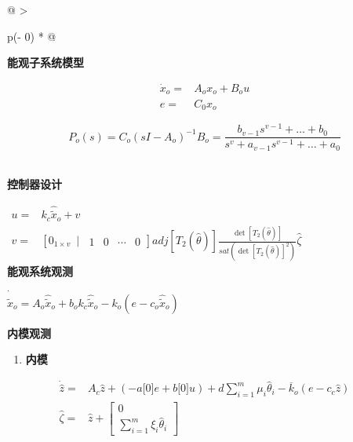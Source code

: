 \documentclass[
  12pt,
  a4paper
]{article}
\begin{document}
\begin{longtable}[]{@{}
  >{\raggedright\arraybackslash}p{}@{}}
\toprule\noalign{}
\begin{minipage}[b]{\linewidth}\raggedright
\textbf{能观子系统模型}

\[\begin{aligned}
{\dot{x}}_{o} = & A_{o}x_{o} + B_{o}u \\
e = & C_{0}x_{o}
\end{aligned}\]

\[P_{o}(s) = C_{o}\left( sI - A_{o} \right)^{- 1}B_{o} = \frac{b_{v - 1}s^{v - 1} + \ldots + b_{0}}{s^{v} + a_{v - 1}s^{v - 1} + \ldots + a_{0}}\]
\end{minipage} \\
\midrule\noalign{}
\endhead
\bottomrule\noalign{}
\endlastfoot
\textbf{控制器设计}

\(\begin{aligned}
u = & k_{c}{\widehat{\widetilde{x}}}_{o} + v \\
v = & \left\lbrack 0_{1 \times v}\ \mid\ \begin{matrix}
1 & 0 & \cdots & 0
\end{matrix} \right\rbrack adj\left\lbrack T_{2}\left( \widehat{\theta} \right) \right\rbrack\frac{\det\left\lbrack T_{2}\left( \widehat{\theta} \right) \right\rbrack}{sat\left( {\det\left\lbrack T_{2}\left( \widehat{\theta} \right) \right\rbrack}^{2} \right)}\widehat{\zeta}
\end{aligned}\) \\
\textbf{能观系统观测}

\({\dot{\widehat{\widetilde{x}}}}_{o} = A_{o}{\widehat{\widetilde{x}}}_{o} + b_{o}k_{c}{\widehat{\widetilde{x}}}_{o} - k_{o}(e - c_{o}{\widehat{\widetilde{x}}}_{o})\) \\
\begin{minipage}[t]{\linewidth}\raggedright
\textbf{内模观测}

\begin{enumerate}
\def\labelenumi{\arabic{enumi}.}
\item
  \textbf{内模}
\end{enumerate}

\[\begin{aligned}
\dot{\widehat{z}} = & A_{c}\widehat{z} + ( - a\lbrack 0\rbrack e + b\lbrack 0\rbrack u) + d\sum_{i = 1}^{m}{\mu_{i}{\widehat{\theta}}_{i}} - {\overline{k}}_{o}\left( e - c_{c}\widehat{z} \right) \\
\widehat{\zeta} = & \widehat{z} + \begin{bmatrix}
0 \\
\sum_{i = 1}^{m}{\xi_{i}{\widehat{\theta}}_{i}}
\end{bmatrix}
\end{aligned}\]


\end{minipage}
\end{longtable}
\end{document}
